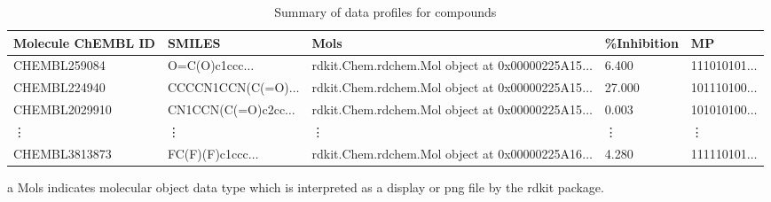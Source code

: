 
\begin{table}[h] %
	\centering
	\begin{threeparttable}
		\renewcommand{\arraystretch}{1.2} %
		\small
		\begin{tabular}{p{3cm} p{4cm} p{4cm} p{2cm} p{2cm}} %
			\hline
			Molecule ChEMBL ID & SMILES & Mols \tnote{a} & \%Inhibition & MP \\ 
			\hline
			CHEMBL259084 & O=C(O)c1ccc$\ldots$ & rdkit.Chem.rdchem.Mol object at 0x00000225A15$\ldots$ & 6.400 & 111010101$\ldots$ \\ 
			CHEMBL224940 & CCCCN1CCN(C(=O)$\ldots$& rdkit.Chem.rdchem.Mol object at 0x00000225A15$\ldots$ & 27.000 & 101110100$\ldots$ \\ 
			CHEMBL2029910 & CN1CCN(C(=O)c2cc$\ldots$ & rdkit.Chem.rdchem.Mol object at 0x00000225A15$\ldots$ & 0.003 & 101010100$\ldots$ \\ 
			\vdots & \vdots & \vdots & \vdots & \vdots \\
			CHEMBL3813873	 & FC(F)(F)c1ccc$\ldots$ & rdkit.Chem.rdchem.Mol object at 0x00000225A16$\ldots$ & 4.280 & 111110101$\ldots$ \\ 
			\hline
		\end{tabular}
		\begin{tablenotes}
			\item[a] Mols indicates molecular object data type which is interpreted as a display or png file by the rdkit package. 
		\end{tablenotes}
	\end{threeparttable}
	\caption{Summary of data profiles for compounds}
	\label{tab:summary}
\end{table}

